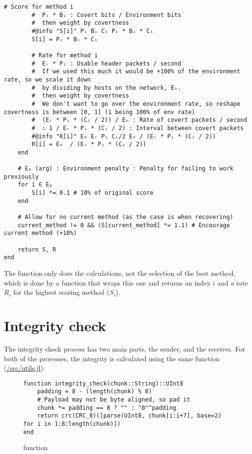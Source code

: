 \begin{lstlisting}[language=JuliaLocal, style=julia]
        # Score for method i
        #  Pᵢ * Bᵢ : Covert bits / Environment bits
        #  then weight by covertness
        #@info "S[i]" Pᵢ Bᵢ Cᵢ Pᵢ * Bᵢ * Cᵢ
        S[i] = Pᵢ * Bᵢ * Cᵢ

        # Rate for method i
        #  Eᵣ * Pᵢ : Usable header packets / second
        #  If we used this much it would be +100% of the environment rate, so we scale it down
        #  by dividing by hosts on the network, Eₕ.
        #  then weight by covertness
        #  We don't want to go over the environment rate, so reshape covertness is between [0, 1] (1 being 100% of env rate)
        #  (Eᵣ * Pᵢ * (Cᵢ / 2)) / Eₕ : Rate of covert packets / second
        #  ∴ 1 / Eᵣ * Pᵢ * (Cᵢ / 2) : Interval between covert packets
        #@info "R[i]" Eₕ Eᵣ Pᵢ Cᵢ/2 Eₕ / (Eᵣ * Pᵢ * (Cᵢ / 2))
        R[i] = Eₕ  / (Eᵣ * Pᵢ * (Cᵢ / 2)) 
    end

    # Eₚ (arg) : Environment penalty : Penalty for failing to work previously
    for i ∈ Eₚ
        S[i] *= 0.1 # 10% of original score
    end

    # Allow for no current method (as the case is when recovering)
    current_method != 0 && (S[current_method] *= 1.1) # Encourage current method (+10%)

    return S, R
end
\end{lstlisting}

The  function only does the calculations, not the selection of the best method, which is done by a function that wraps this one and returns an index $i$ and a rate $R_i$ for the highest scoring method ($S_i$).

\section{Integrity check}
\label{sec:integrity_impl}

The integrity check process has two main parts, the sender, and the receiver. For both of the processes, the integrity is calculated using the same function (\url{/src/utils.jl}):

\begin{figure}[h]
\begin{lstlisting}[language=JuliaLocal, style=julia]
function integrity_check(chunk::String)::UInt8
    padding = 8 - (length(chunk) % 8)
    # Payload may not be byte aligned, so pad it
    chunk *= padding == 8 ? "" : "0"^padding
    return crc(CRC_8)([parse(UInt8, chunk[i:i+7], base=2) for i in 1:8:length(chunk)])
end
\end{lstlisting}
\caption{ function}
\end{figure}


